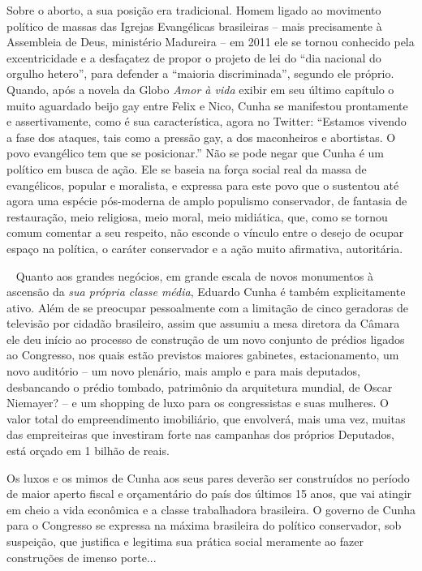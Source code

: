 Sobre o aborto, a sua posição era tradicional. Homem ligado ao movimento
político de massas das Igrejas Evangélicas brasileiras -- mais
precisamente à Assembleia de Deus, ministério Madureira -- em 2011 ele
se tornou conhecido pela excentricidade e a desfaçatez de propor o
projeto de lei do ``dia nacional do orgulho hetero'', para defender a
``maioria discriminada'', segundo ele próprio. Quando, após a novela da
Globo \emph{Amor à vida} exibir em seu último capítulo o muito aguardado
beijo gay entre Felix e Nico, Cunha se manifestou prontamente e
assertivamente, como é sua característica, agora no Twitter: ``Estamos
vivendo a fase dos ataques, tais como a pressão gay, a dos maconheiros e
abortistas. O povo evangélico tem que se posicionar.'' Não se pode negar
que Cunha é um político em busca de ação. Ele se baseia na força social
real da massa de evangélicos, popular e moralista, e expressa para este
povo que o sustentou até agora uma espécie pós-moderna de amplo
populismo conservador, de fantasia de restauração, meio religiosa, meio
moral, meio midiática, que, como se tornou comum comentar a seu
respeito, não esconde o vínculo entre o desejo de ocupar espaço na
política, o caráter conservador e a ação muito afirmativa, autoritária.

~ Quanto aos grandes negócios, em grande escala de novos monumentos à
ascensão da \emph{sua própria classe média}, Eduardo Cunha é também
explicitamente ativo. Além de se preocupar pessoalmente com a limitação
de cinco geradoras de televisão por cidadão brasileiro, assim que
assumiu a mesa diretora da Câmara ele deu início ao processo de
construção de um novo conjunto de prédios ligados ao Congresso, nos
quais estão previstos maiores gabinetes, estacionamento, um novo
auditório -- um novo plenário, mais amplo e para mais deputados,
desbancando o prédio tombado, patrimônio da arquitetura mundial, de
Oscar Niemayer? -- e um shopping de luxo para os congressistas e suas
mulheres. O valor total do empreendimento imobiliário, que envolverá,
mais uma vez, muitas das empreiteiras que investiram forte nas campanhas
dos próprios Deputados, está orçado em 1 bilhão de reais.

Os luxos e os mimos de Cunha aos seus pares deverão ser construídos no
período de maior aperto fiscal e orçamentário do país dos últimos 15
anos, que vai atingir em cheio a vida econômica e a classe trabalhadora
brasileira. O governo de Cunha para o Congresso se expressa na máxima
brasileira do político conservador, sob suspeição, que justifica e
legitima sua prática social meramente ao fazer construções de imenso
porte...

